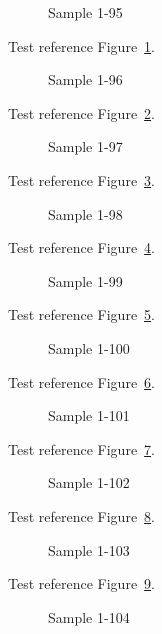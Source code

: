 \begin{figure}[tbhp]
\caption{Sample 1-95}
\label{fig:sample-1-95}
\end{figure}

Test reference Figure~\ref{fig:sample-1-95}.

\begin{figure}[tbhp]
\caption{Sample 1-96}
\label{fig:sample-1-96}
\end{figure}

Test reference Figure~\ref{fig:sample-1-96}.

\begin{figure}[tbhp]
\caption{Sample 1-97}
\label{fig:sample-1-97}
\end{figure}

Test reference Figure~\ref{fig:sample-1-97}.

\begin{figure}[tbhp]
\caption{Sample 1-98}
\label{fig:sample-1-98}
\end{figure}

Test reference Figure~\ref{fig:sample-1-98}.

\begin{figure}[tbhp]
\caption{Sample 1-99}
\label{fig:sample-1-99}
\end{figure}

Test reference Figure~\ref{fig:sample-1-99}.

\begin{figure}[tbhp]
\caption{Sample 1-100}
\label{fig:sample-1-100}
\end{figure}

Test reference Figure~\ref{fig:sample-1-100}.

\begin{figure}[tbhp]
\caption{Sample 1-101}
\label{fig:sample-1-101}
\end{figure}

Test reference Figure~\ref{fig:sample-1-101}.

\begin{figure}[tbhp]
\caption{Sample 1-102}
\label{fig:sample-1-102}
\end{figure}

Test reference Figure~\ref{fig:sample-1-102}.

\begin{figure}[tbhp]
\caption{Sample 1-103}
\label{fig:sample-1-103}
\end{figure}

Test reference Figure~\ref{fig:sample-1-103}.

\begin{figure}[tbhp]
\caption{Sample 1-104}
\label{fig:sample-1-104}
\end{figure}

